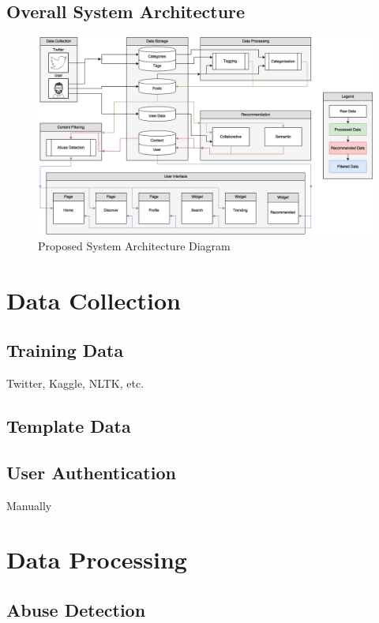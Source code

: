 \subsection{Overall System Architecture}
\begin{figure}[H]
  \centering
  \includegraphics[width=1.0\textwidth]{Images/Design/SystemArchitecture}
  \caption{Proposed System Architecture Diagram} \label{fig:SystemArchitecture} 
\end{figure}

\section{Data Collection}

\subsection{Training Data}
Twitter, Kaggle, NLTK, etc.

\subsection{Template Data}


\subsection{User Authentication}
Manually

\section{Data Processing}
\subsection{Abuse Detection}
